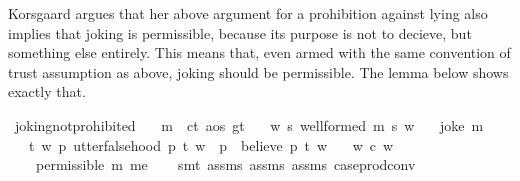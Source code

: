 \begin{isabellebody}
\begin{isamarkuptext}
Korsgaard argues that her above argument for a prohibition against lying also implies that joking is 
permissible, because its purpose is not to decieve, but something else entirely. This means that, 
even armed with the same convention of trust assumption as above, joking should be permissible. The 
lemma below shows exactly that.%
\end{isamarkuptext}\isamarkuptrue%
\isamarkupfalse%
\ joking{\isacharunderscore}not{\isacharunderscore}prohibited{\isacharcolon}\isanewline
\ \ \ {\isachardoublequoteopen}m\ {\isasymequiv}\ {\isacharparenleft}c{\isacharcolon}{\isacharcolon}t{\isacharcomma}\ a{\isacharcolon}{\isacharcolon}os{\isacharcomma}\ g{\isacharcolon}{\isacharcolon}t{\isacharparenright}{\isachardoublequoteclose}\isanewline
\ \ \ {\isachardoublequoteopen}{\isasymforall}w{\isachardot}\ {\isasymforall}s{\isachardot}\ well{\isacharunderscore}formed\ m\ s\ w{\isachardoublequoteclose}\isanewline
%
\isanewline
\ \ \ {\isachardoublequoteopen}joke\ m{\isachardoublequoteclose}\isanewline
%
\isanewline
\ \ \ {\isachardoublequoteopen}{\isasymforall}t\ w{\isachardot}\ {\isacharparenleft}{\isacharparenleft}{\isasymforall}p{\isachardot}\ utter{\isacharunderscore}falsehood\ p\ t\ w{\isacharparenright}\ {\isasymlongrightarrow}\ {\isacharparenleft}{\isasymforall}p{\isachardot}\ \isactrlbold {\isasymnot}\ {\isacharparenleft}believe\ p\ t{\isacharparenright}\ w{\isacharparenright}{\isacharparenright}{\isachardoublequoteclose}\isanewline
%
\isanewline
\ \ \ {\isachardoublequoteopen}{\isasymforall}w{\isachardot}\ c\ w{\isachardoublequoteclose}\isanewline
%
\isanewline
\ \ \ {\isachardoublequoteopen}{\isasymTurnstile}\ {\isacharparenleft}permissible\ m\ me{\isacharparenright}{\isachardoublequoteclose}\isanewline
%
\isadelimproof
\ \ %
\endisadelimproof
%
\isatagproof
{}\isamarkupfalse%
\ {\isacharparenleft}smt\ assms{\isacharparenleft}{}{\isacharparenright}\ assms{\isacharparenleft}{}{\isacharparenright}\ assms{\isacharparenleft}{}{\isacharparenright}\ case{\isacharunderscore}prod{\isacharunderscore}conv{\isacharparenright}\isanewline

\end{isabellebody}
